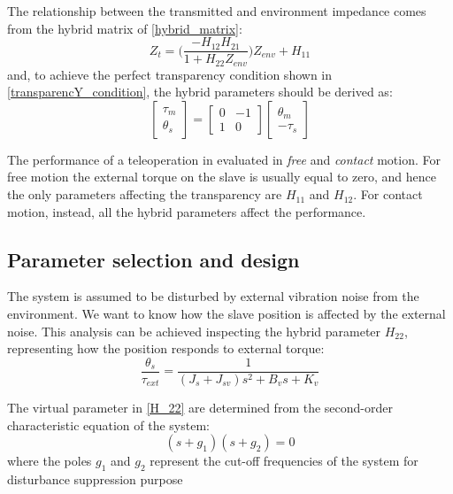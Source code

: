 The relationship between the transmitted and environment impedance comes from the hybrid matrix of \eqref{hybrid_matrix}:
\begin{equation}
	Z_t = \big(\dfrac{-H_{12} H_{21}}{1 + H_{22} Z_{env}}\big)Z_{env} + H_{11}
\end{equation}
and, to achieve the perfect transparency condition shown in \eqref{transparencY_condition}, the hybrid parameters should be derived as:
\begin{equation}
	\begin{bmatrix}
	\tau_m \\ \theta_s
	\end{bmatrix} = 
	\begin{bmatrix}
	0 & -1 \\ 1 & 0
	\end{bmatrix}
	\begin{bmatrix}
	\theta_m \\ -\tau_s
	\end{bmatrix}
\end{equation}

The performance of a teleoperation in evaluated in \emph{free} and \emph{contact} motion. For free motion the external torque on the slave is usually equal to zero, and hence the only parameters affecting the transparency are $ H_{11} $ and $ H_{12} $. For contact motion, instead, all the hybrid parameters affect the performance.

\subsection*{Parameter selection and design}

The system is assumed to be disturbed by external vibration noise from the environment. We want to know how the slave position is affected by the external noise. This analysis can be achieved inspecting the hybrid parameter $ H_{22} $, representing how the position responds to external torque:
\begin{equation}
	\dfrac{\theta_s}{\tau_{ext}} = \dfrac{1}{(J_s + J_{sv}) s^2 + B_v s + K_v}
	\label{H_22}
\end{equation}

The virtual parameter in \eqref{H_22} are determined from the second-order characteristic equation of the system:
\begin{equation}
	(s + g_1)(s + g_2) = 0
	\label{charact_equation}
\end{equation}  
where the poles $ g_1 $ and $ g_2 $ represent the cut-off frequencies of the system for disturbance suppression purpose

